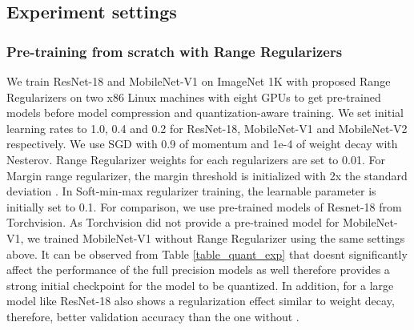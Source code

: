 \documentclass[10pt,twocolumn,letterpaper]{article}
\begin{document}
\subsection{Experiment settings}
\subsubsection{Pre-training from scratch with Range Regularizers}
We train ResNet-18\cite{he2016deep} and MobileNet-V1\cite{howard2017mobilenets} on ImageNet 1K\cite{deng2009imagenet} with proposed Range Regularizers on two x86 Linux machines with eight GPUs to get pre-trained models before model compression and quantization-aware training. We set initial learning rates to 1.0, 0.4 and 0.2 for ResNet-18, MobileNet-V1 and MobileNet-V2 respectively. We use SGD with 0.9 of momentum and 1e-4 of weight decay with Nesterov. Range Regularizer weights for each regularizers are set to 0.01. For Margin range regularizer, the margin threshold is initialized with 2x the standard deviation . In Soft-min-max regularizer training, the learnable parameter  is initially set to 0.1. For comparison, we use pre-trained models of Resnet-18 from Torchvision. As Torchvision did not provide a pre-trained model for MobileNet-V1, we trained MobileNet-V1 without Range Regularizer using the same settings above. It can be observed from Table \ref{table_quant_exp} that  doesnt significantly affect the performance of the full precision models as well therefore provides a strong initial checkpoint for the model to be quantized. In addition, for a large model like ResNet-18  also shows a regularization effect similar to weight decay, therefore, better validation accuracy than the one without .
\end{document}
